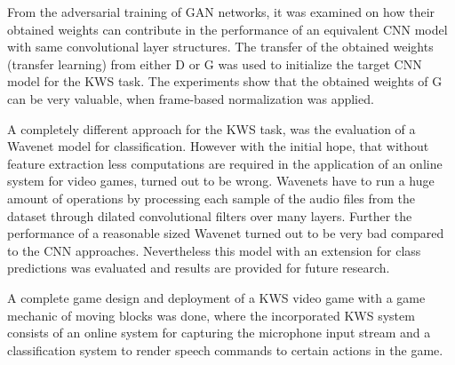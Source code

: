 From the adversarial training of GAN networks, it was examined on how their obtained weights can contribute in the performance of an equivalent CNN model with same convolutional layer structures.
The transfer of the obtained weights (transfer learning) from either D or G was used to initialize the target CNN model for the KWS task.
The experiments show that the obtained weights of G can be very valuable, when frame-based normalization was applied.

A completely different approach for the KWS task, was the evaluation of a Wavenet \cite{Oord2016} model for classification.
However with the initial hope, that without feature extraction less computations are required in the application of an online system for video games, turned out to be wrong.
Wavenets have to run a huge amount of operations by processing each sample of the audio files from the dataset through dilated convolutional filters over many layers.
Further the performance of a reasonable sized Wavenet turned out to be very bad compared to the CNN approaches.
Nevertheless this model with an extension for class predictions was evaluated and results are provided for future research.

A complete game design and deployment of a KWS video game with a game mechanic of moving blocks was done, where the incorporated KWS system consists of an online system for capturing the microphone input stream and a classification system to render speech commands to certain actions in the game.